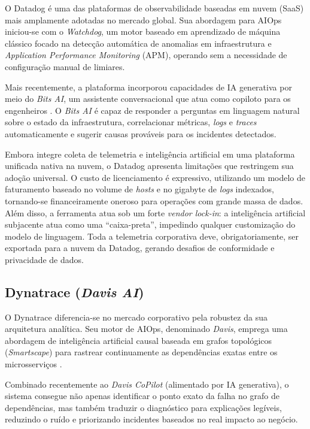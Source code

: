 O Datadog é uma das plataformas de observabilidade baseadas em nuvem (SaaS) mais amplamente adotadas no mercado global. Sua abordagem para AIOps iniciou-se com o \textit{Watchdog}, um motor baseado em aprendizado de máquina clássico focado na detecção automática de anomalias em infraestrutura e \textit{Application Performance Monitoring} (APM), operando sem a necessidade de configuração manual de limiares.

Mais recentemente, a plataforma incorporou capacidades de IA generativa por meio do \textit{Bits AI}, um assistente conversacional que atua como copiloto para os engenheiros \cite{datadog2024bits}. O \textit{Bits AI} é capaz de responder a perguntas em linguagem natural sobre o estado da infraestrutura, correlacionar métricas, \textit{logs} e \textit{traces} automaticamente e sugerir causas prováveis para os incidentes detectados.

Embora integre coleta de telemetria e inteligência artificial em uma plataforma unificada nativa na nuvem, o Datadog apresenta limitações que restringem sua adoção universal. O custo de licenciamento é expressivo, utilizando um modelo de faturamento baseado no volume de \textit{hosts} e no gigabyte de \textit{logs} indexados, tornando-se financeiramente oneroso para operações com grande massa de dados. Além disso, a ferramenta atua sob um forte \textit{vendor lock-in}: a inteligência artificial subjacente atua como uma ``caixa-preta'', impedindo qualquer customização do modelo de linguagem. Toda a telemetria corporativa deve, obrigatoriamente, ser exportada para a nuvem da Datadog, gerando desafios de conformidade e privacidade de dados.

\subsection{Dynatrace (\textit{Davis AI})}

O Dynatrace diferencia-se no mercado corporativo pela robustez da sua arquitetura analítica. Seu motor de AIOps, denominado \textit{Davis}, emprega uma abordagem de inteligência artificial causal baseada em grafos topológicos (\textit{Smartscape}) para rastrear continuamente as dependências exatas entre os microsserviços \cite{dynatrace2024davis}. 

Combinado recentemente ao \textit{Davis CoPilot} (alimentado por IA generativa), o sistema consegue não apenas identificar o ponto exato da falha no grafo de dependências, mas também traduzir o diagnóstico para explicações legíveis, reduzindo o ruído e priorizando incidentes baseados no real impacto ao negócio.

